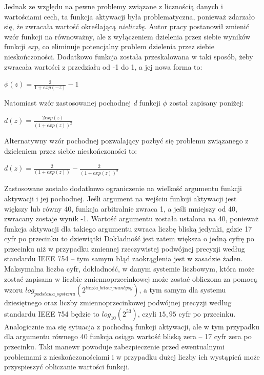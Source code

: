 Jednak ze względu na pewne problemy związane z licznością danych i wartościami cech, ta funkcja aktywacji była problematyczna, ponieważ zdarzało się, że zwracała wartość określającą \emph{nieliczbę}.
Autor pracy postanowił zmienić wzór funkcji na równoważny, ale z wyłączeniem dzielenia przez siebie wyników funkcji \emph{exp}, co eliminuje potencjalny problem dzielenia przez siebie nieskończoności.
Dodatkowo funkcja została przeskalowana w taki sposób, żeby zwracała wartości z przedziału od -1 do 1, a jej nowa forma to:
\begin{center}
\( \phi(z) = \frac{2}{1 + exp(-z)} - 1 \)
\end{center}

Natomiast wzór zastosowanej pochodnej \emph{d} funkcji \( \phi \) został zapisany poniżej:
\begin{center}
\( d(z) = \frac{2exp(z)}{(1 + exp(z))^{2}} \)
\end{center}

Alternatywny wzór pochodnej pozwalający pozbyć się problemu związanego z dzieleniem przez siebie nieskończoności to:
\begin{center}
\( d(z) = \frac{2}{(1 + exp(z))} - \frac{2}{(1 + exp(z))^{2}} \)
\end{center}

Zastosowane zostało dodatkowo ograniczenie na wielkość argumentu funkcji aktywacji i jej pochodnej.
Jeśli argument na wejściu funkcji aktywacji jest większy lub równy 40, funkcja arbitralnie zwraca 1, a jeśli mniejszy od 40, zwracany zostaje wynik -1.
Wartość argumentu została ustalona na 40, ponieważ funkcja aktywacji dla takiego argumentu zwraca liczbę bliską jedynki, gdzie 17 cyfr po przecinku to dziewiątki
Dokładność jest zatem większa o jedną cyfrę po przecinku niż w przypadku zmiennej rzeczywistej podwójnej precyzji według standardu IEEE 754 -- tym samym błąd zaokrąglenia jest w zasadzie żaden.
Maksymalna liczba cyfr, dokładność, w danym systemie liczbowym, która może zostać zapisana w liczbie zmiennoprzecinkowej może zostać obliczona za pomocą wzoru $ log_{podstawa\_systemu}(2^{liczba\_bitow\_mantysy}) $, a tym samym dla systemu dziesiętnego oraz liczby zmiennoprzecinkowej podwójnej precyzji według standardu IEEE 754 będzie to $ log_{10}(2^{53}) $, czyli $ 15,95 $ cyfr po przecinku.
Analogicznie ma się sytuacja z pochodną funkcji aktywacji, ale w tym przypadku dla argumentu równego 40 funkcja osiąga wartość bliską zera -- 17 cyfr zera po przecinku.
Taki manewr powoduje zabezpieczenie przed ewentualnymi problemami z nieskończonościami i w przypadku dużej liczby ich wystąpień może przyspieszyć obliczanie wartości funkcji.

